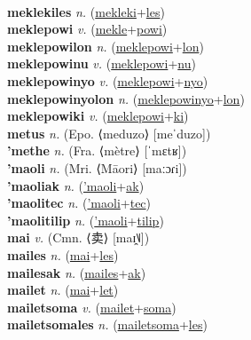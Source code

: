  \label{mekleki} \\
\textbf{meklekiles} \textit{n.} (\hyperref[mekleki]{mekleki}+\hyperref[les]{les})
 \label{meklekiles} \\
\textbf{meklepowi} \textit{v.} (\hyperref[mekle]{mekle}+\hyperref[powi]{powi})
 \label{meklepowi} \\
\textbf{meklepowilon} \textit{n.} (\hyperref[meklepowi]{meklepowi}+\hyperref[lon]{lon})
 \label{meklepowilon} \\
\textbf{meklepowinu} \textit{v.} (\hyperref[meklepowi]{meklepowi}+\hyperref[nu]{nu})
 \label{meklepowinu} \\
\textbf{meklepowinyo} \textit{v.} (\hyperref[meklepowi]{meklepowi}+\hyperref[nyo]{nyo})
 \label{meklepowinyo} \\
\textbf{meklepowinyolon} \textit{n.} (\hyperref[meklepowinyo]{meklepowinyo}+\hyperref[lon]{lon})
 \label{meklepowinyolon} \\
\textbf{meklepowiki} \textit{v.} (\hyperref[meklepowi]{meklepowi}+\hyperref[ki]{ki})
 \label{meklepowiki} \\
\textbf{metus} \textit{n.} (Epo. ⟨meduzo⟩ [meˈduzo])
 \label{metus} \\
\textbf{'methe} \textit{n.} (Fra. ⟨mètre⟩ [ˈmɛtʁ])
 \label{'methe} \\
\textbf{'maoli} \textit{n.} (Mri. ⟨Māori⟩ [maːɔɾi])
 \label{'maoli} \\
\textbf{'maoliak} \textit{n.} (\hyperref['maoli]{'maoli}+\hyperref[ak]{ak})
 \label{'maoliak} \\
\textbf{'maolitec} \textit{n.} (\hyperref['maoli]{'maoli}+\hyperref[tec]{tec})
 \label{'maolitec} \\
\textbf{'maolitilip} \textit{n.} (\hyperref['maoli]{'maoli}+\hyperref[tilip]{tilip})
 \label{'maolitilip} \\
\textbf{mai} \textit{v.} (Cmn. ⟨卖⟩ [maɪ̯˥˩])
 \label{mai} \\
\textbf{mailes} \textit{n.} (\hyperref[mai]{mai}+\hyperref[les]{les})
 \label{mailes} \\
\textbf{mailesak} \textit{n.} (\hyperref[mailes]{mailes}+\hyperref[ak]{ak})
 \label{mailesak} \\
\textbf{mailet} \textit{n.} (\hyperref[mai]{mai}+\hyperref[let]{let})
 \label{mailet} \\
\textbf{mailetsoma} \textit{v.} (\hyperref[mailet]{mailet}+\hyperref[soma]{soma})
 \label{mailetsoma} \\
\textbf{mailetsomales} \textit{n.} (\hyperref[mailetsoma]{mailetsoma}+\hyperref[les]{les})
